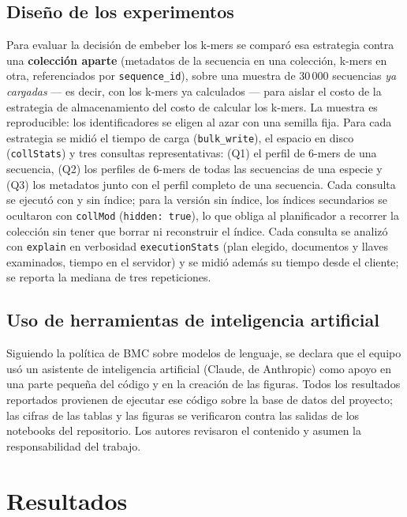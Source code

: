 \documentclass[pdflatex,sn-vancouver-num,lineno,referee]{sn-jnl}
\begin{document}
\subsection{Diseño de los experimentos}\label{sec:experimentos}

Para evaluar la decisión de embeber los k-mers se comparó esa estrategia
contra una \textbf{colección aparte} (metadatos de la secuencia en una
colección, k-mers en otra, referenciados por \texttt{sequence\_id}), sobre una
muestra de 30\,000 secuencias \emph{ya cargadas} --- es decir, con los k-mers
ya calculados --- para aislar el costo de la estrategia de almacenamiento del
costo de calcular los k-mers. La muestra es reproducible: los identificadores
se eligen al azar con una semilla fija. Para cada estrategia se midió el
tiempo de carga (\texttt{bulk\_write}), el espacio en disco
(\texttt{collStats}) y tres consultas representativas: (Q1) el perfil de
6-mers de una secuencia, (Q2) los perfiles de 6-mers de todas las secuencias
de una especie y (Q3) los metadatos junto con el perfil completo de una
secuencia. Cada consulta se ejecutó con y sin índice; para la versión sin
índice, los índices secundarios se ocultaron con \texttt{collMod}
(\texttt{hidden:\,true}), lo que obliga al planificador a recorrer la
colección sin tener que borrar ni reconstruir el índice. Cada consulta se
analizó con \texttt{explain} en verbosidad \texttt{executionStats} (plan
elegido, documentos y llaves examinados, tiempo en el servidor) y se midió
además su tiempo desde el cliente; se reporta la mediana de tres
repeticiones.

\subsection{Uso de herramientas de inteligencia artificial}

Siguiendo la política de BMC sobre modelos de lenguaje, se declara que el
equipo usó un asistente de inteligencia artificial (Claude, de Anthropic)
como apoyo en una parte pequeña del código y en la creación de las figuras.
Todos los resultados reportados provienen de ejecutar ese código sobre la
base de datos del proyecto; las cifras de las tablas y las figuras se
verificaron contra las salidas de los notebooks del repositorio. Los autores
revisaron el contenido y asumen la responsabilidad del trabajo.

\section{Resultados}\label{sec:resultados}
\end{document}
